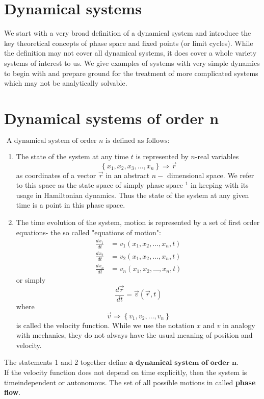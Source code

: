 \section{Dynamical systems}
We start with a very broad definition of a dynamical system and introduce the key theoretical concepts of phase space and fixed points (or limit cycles). While the definition may not cover all dynamical systems, it does cover a whole variety systems of interest to us. We give examples of systems with very simple dynamics to begin with and prepare ground for the treatment of more complicated systems which may not be analytically solvable.
\section{ Dynamical systems of order n}
$\text { A dynamical system of order } n \text { is defined as follows: }$
\begin{enumerate}
	\item The state of the system at any time $t$ is represented by $n$-real variables
	$$
	\left\{x_{1}, x_{2}, x_{3}, \ldots, x_{n}\right\} \Rightarrow \vec{r}
	$$
	as coordinates of a vector $\vec{r}$ in an abstract $n-$ dimensional space. We refer to this space as the state space of simply phase space ${ }^{1}$ in keeping with its usage in Hamiltonian dynamics. Thus the state of the system at any given time is a point in this phase space.
	\item The time evolution of the system, motion is represented by a set of first order equations- the so called "equations of motion":
	\begin{align}
	\frac{d x_{1}}{d t} &=v_{1}\left(x_{1}, x_{2}, \ldots, x_{n}, t\right) \\
	\frac{d x_{2}}{d t} &=v_{2}\left(x_{1}, x_{2}, \ldots, x_{n}, t\right) \\
	\frac{d x_{n}}{d t} &=v_{n}\left(x_{1}, x_{2}, \ldots, x_{n}, t\right)
	\end{align}
	or simply
	$$
	\frac{d \vec{r}}{d t}=\vec{v}(\vec{r}, t)
	$$
	where
	$$
	\vec{v} \Rightarrow\left\{v_{1}, v_{2}, \ldots, v_{n}\right\}
	$$
	is called the velocity function. While we use the notation $x$ and $v$ in analogy with mechanics, they do not always have the usual meaning of position and velocity.
\end{enumerate}
The statements 1 and 2 together define  $\textbf{a dynamical system of order n}$.\\
 If the velocity function does not depend on time explicitly, then the system is timeindependent or autonomous. The set of all possible motions in called \textbf{phase flow}.\\
